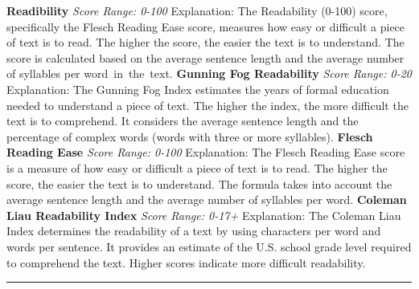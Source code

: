 \documentclass[table]{rapportCS}
\begin{document}
\textbf{}\newline
\textbf{Readibility}\newline
\textit{Score Range: 0-100}\newline
Explanation: The Readability (0-100) score, specifically the Flesch Reading Ease score, measures how easy or difficult a piece of text is to read. The higher the score, the easier the text is to understand. The score is calculated based on the average sentence length and the average number of syllables per word in the text.
\textbf{}\newline
\textbf{Gunning Fog Readability}\newline
\textit{Score Range: 0-20}\newline
Explanation: The Gunning Fog Index estimates the years of formal education needed to understand a piece of text. The higher the index, the more difficult the text is to comprehend. It considers the average sentence length and the percentage of complex words (words with three or more syllables).
\textbf{}\newline
\textbf{Flesch Reading Ease}\newline
\textit{Score Range: 0-100}\newline
Explanation: The Flesch Reading Ease score is a measure of how easy or difficult a piece of text is to read. The higher the score, the easier the text is to understand. The formula takes into account the average sentence length and the average number of syllables per word.
\textbf{}\newline
\textbf{Coleman Liau Readability Index}\newline
\textit{Score Range: 0-17+}\newline
Explanation: The Coleman Liau Index determines the readability of a text by using characters per word and words per sentence. It provides an estimate of the U.S. school grade level required to comprehend the text. Higher scores indicate more difficult readability.


\rule{\linewidth}{0.5pt}
\end{document}
